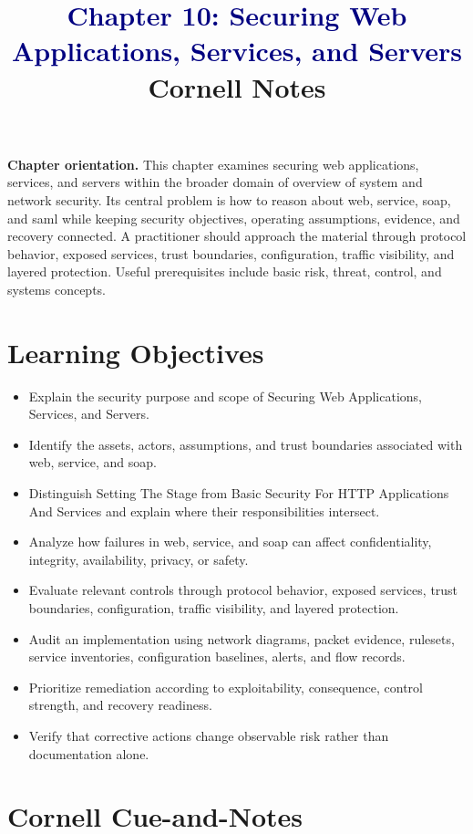\documentclass[11pt]{article}
\title{\textcolor{Navy}{Chapter 10: Securing Web Applications, Services, and Servers}\\[2mm]\large Cornell Notes}
\author{}
\date{}
\begin{document}
\maketitle
\thispagestyle{fancy}
\vspace{-1.5em}
\begin{orientationbox}
\textbf{Chapter orientation.} This chapter examines securing web applications, services, and servers within the broader domain of overview of system and network security. Its central problem is how to reason about web, service, soap, and saml while keeping security objectives, operating assumptions, evidence, and recovery connected. A practitioner should approach the material through protocol behavior, exposed services, trust boundaries, configuration, traffic visibility, and layered protection. Useful prerequisites include basic risk, threat, control, and systems concepts.
\end{orientationbox}
\section*{Learning Objectives}
\begin{itemize}
\item Explain the security purpose and scope of Securing Web Applications, Services, and Servers.
\item Identify the assets, actors, assumptions, and trust boundaries associated with web, service, and soap.
\item Distinguish Setting The Stage from Basic Security For HTTP Applications And Services and explain where their responsibilities intersect.
\item Analyze how failures in web, service, and soap can affect confidentiality, integrity, availability, privacy, or safety.
\item Evaluate relevant controls through protocol behavior, exposed services, trust boundaries, configuration, traffic visibility, and layered protection.
\item Audit an implementation using network diagrams, packet evidence, rulesets, service inventories, configuration baselines, alerts, and flow records.
\item Prioritize remediation according to exploitability, consequence, control strength, and recovery readiness.
\item Verify that corrective actions change observable risk rather than documentation alone.
\end{itemize}
\section*{Cornell Cue-and-Notes}
\end{document}

